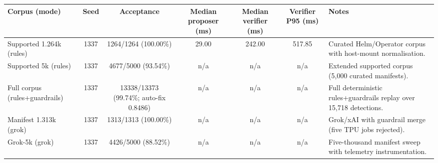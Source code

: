\begin{tabularx}{\textwidth}{@{}l c c c c c X@{}}
\toprule
\textbf{Corpus (mode)} & \textbf{Seed} & \textbf{Acceptance} & \textbf{Median proposer (ms)} & \textbf{Median verifier (ms)} & \textbf{Verifier P95 (ms)} & \textbf{Notes} \\
\midrule
Supported 1.264k (rules) & 1337 & 1264/1264 (100.00\%) & 29.00 & 242.00 & 517.85 & Curated Helm/Operator corpus with host-mount normalisation. \\
Supported 5k (rules) & 1337 & 4677/5000 (93.54\%) & n/a & n/a & n/a & Extended supported corpus (5,000 curated manifests). \\
Full corpus (rules+guardrails) & 1337 & 13338/13373 (99.74\%; auto-fix 0.8486) & n/a & n/a & n/a & Full deterministic rules+guardrails replay over 15,718 detections. \\
Manifest 1.313k (grok) & 1337 & 1313/1313 (100.00\%) & n/a & n/a & n/a & Grok/xAI with guardrail merge (five TPU jobs rejected). \\
Grok-5k (grok) & 1337 & 4426/5000 (88.52\%) & n/a & n/a & n/a & Five-thousand manifest sweep with telemetry instrumentation. \\
\bottomrule
\end{tabularx}
